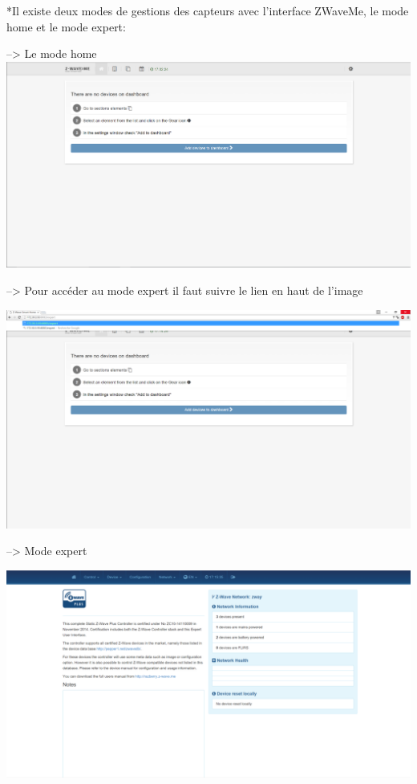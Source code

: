 *Il existe deux modes de gestions des capteurs avec l'interface ZWaveMe, le mode home et le mode expert:


--> Le mode home
\includegraphics[scale=0.5]{./latex/Images/png/home_zwaveme.png}\newline

--> Pour accéder au mode expert il faut suivre le lien en haut de l'image

\includegraphics[scale=0.5]{./latex/Images/png/go_to_zwaveme.png}\newline

--> Mode expert

\includegraphics[scale=0.5]{./latex/Images/png/expert_zwaveme.png}\newline


